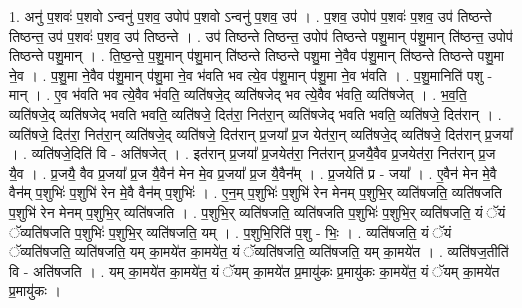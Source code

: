 \documentclass[17pt]{extarticle}
\begin{document}
1. अनु॑ प॒शवः॑ प॒शवो ऽन्वनु॑ प॒शव॒ उपोप॑ प॒शवो ऽन्वनु॑ प॒शव॒ उप॑ । . प॒शव॒ उपोप॑ प॒शवः॑ प॒शव॒ उप॑ तिष्ठन्ते तिष्ठन्त॒ उप॑ प॒शवः॑ प॒शव॒ उप॑ तिष्ठन्ते । . उप॑ तिष्ठन्ते तिष्ठन्त॒ उपोप॑ तिष्ठन्ते पशु॒मान् प॑शु॒मान् ति॑ष्ठन्त॒ उपोप॑ तिष्ठन्ते पशु॒मान् । . ति॒ष्ठ॒न्ते॒ प॒शु॒मान् प॑शु॒मान् ति॑ष्ठन्ते तिष्ठन्ते पशु॒मा ने॒वैव प॑शु॒मान् ति॑ष्ठन्ते तिष्ठन्ते पशु॒मा ने॒व । . प॒शु॒मा ने॒वैव प॑शु॒मान् प॑शु॒मा ने॒व भ॑वति भव त्ये॒व प॑शु॒मान् प॑शु॒मा ने॒व भ॑वति । . प॒शु॒मानिति॑ पशु - मान् । . ए॒व भ॑वति भव त्ये॒वैव भ॑वति॒ व्यति॑षजे॒द् व्यति॑षजेद् भव त्ये॒वैव भ॑वति॒ व्यति॑षजेत् । . भ॒व॒ति॒ व्यति॑षजे॒द् व्यति॑षजेद् भवति भवति॒ व्यति॑षजे॒ दित॑रा॒ नित॑रा॒न् व्यति॑षजेद् भवति भवति॒ व्यति॑षजे॒ दित॑रान् । . व्यति॑षजे॒ दित॑रा॒ नित॑रा॒न् व्यति॑षजे॒द् व्यति॑षजे॒ दित॑रान् प्र॒जया᳚ प्र॒ज येत॑रा॒न् व्यति॑षजे॒द् व्यति॑षजे॒ दित॑रान् प्र॒जया᳚ । . व्यति॑षजे॒दिति॑ वि - अति॑षजेत् । . इत॑रान् प्र॒जया᳚ प्र॒जयेत॑रा॒ नित॑रान् प्र॒जयै॒वैव प्र॒जयेत॑रा॒ नित॑रान् प्र॒ज यै॒व । . प्र॒जयै॒ वैव प्र॒जया᳚ प्र॒ज यै॒वैन॑ मेन मे॒व प्र॒जया᳚ प्र॒ज यै॒वैन᳚म् । . प्र॒जयेति॑ प्र - जया᳚ । . ए॒वैन॑ मेन मे॒वै वैन॑म् प॒शुभिः॑ प॒शुभि॑ रेन मे॒वै वैन॑म् प॒शुभिः॑ । . ए॒न॒म् प॒शुभिः॑ प॒शुभि॑ रेन मेनम् प॒शुभि॒र् व्यति॑षजति॒ व्यति॑षजति प॒शुभि॑ रेन मेनम् प॒शुभि॒र् व्यति॑षजति । . प॒शुभि॒र् व्यति॑षजति॒ व्यति॑षजति प॒शुभिः॑ प॒शुभि॒र् व्यति॑षजति॒ यं ॅयं ॅव्यति॑षजति प॒शुभिः॑ प॒शुभि॒र् व्यति॑षजति॒ यम् । . प॒शुभि॒रिति॑ प॒शु - भिः॒ । . व्यति॑षजति॒ यं ॅयं ॅव्यति॑षजति॒ व्यति॑षजति॒ यम् का॒मये॑त का॒मये॑त॒ यं ॅव्यति॑षजति॒ व्यति॑षजति॒ यम् का॒मये॑त । . व्यति॑षज॒तीति॑ वि - अति॑षजति । . यम् का॒मये॑त का॒मये॑त॒ यं ॅयम् का॒मये॑त प्र॒मायु॑कः प्र॒मायु॑कः का॒मये॑त॒ यं ॅयम् का॒मये॑त प्र॒मायु॑कः । \newline
\end{document}
